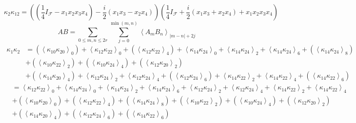 \documentclass[aps,preprint]{revtex4}%
\begin{document}
\begin{equation}
\kappa_{2}\kappa_{12}=\left(  \left(  \frac{1}{4}I_{\mathcal{F}}-x_{1}%
x_{2}x_{3}x_{4}\right)  -\frac{i}{2}\left(  x_{1}x_{3}-x_{2}x_{4}\right)
\right)  \left(  \frac{1}{4}I_{\mathcal{F}}+\frac{i}{2}\left(  x_{1}%
x_{3}+x_{2}x_{4}\right)  +x_{1}x_{2}x_{3}x_{4}\right)
\end{equation}%
\begin{equation}
AB=\sum_{0\leq m,n\leq2r}\sum_{j=0}^{\min\left(  m,n\right)  }\left\langle
A_{m}B_{n}\right\rangle _{\left\vert m-n\right\vert +2j}%
\end{equation}%
\begin{align}
\kappa_{1}\kappa_{2} &  =\left(  \left\langle \kappa_{10}\kappa_{20}%
\right\rangle _{0}\right)  +\left\langle \kappa_{12}\kappa_{22}\right\rangle
_{0}+\left(  \left\langle \kappa_{12}\kappa_{22}\right\rangle _{4}\right)
+\left\langle \kappa_{14}\kappa_{24}\right\rangle _{0}+\left\langle
\kappa_{14}\kappa_{24}\right\rangle _{2}+\left\langle \kappa_{14}\kappa
_{24}\right\rangle _{6}+\left(  \left\langle \kappa_{14}\kappa_{24}%
\right\rangle _{8}\right)  \\
&  +\left(  \left\langle \kappa_{10}\kappa_{22}\right\rangle _{2}\right)
+\left(  \left\langle \kappa_{10}\kappa_{24}\right\rangle _{4}\right)
+\left(  \left\langle \kappa_{12}\kappa_{20}\right\rangle _{2}\right)  \\
&  +\left(  \left\langle \kappa_{14}\kappa_{20}\right\rangle _{4}\right)
+\left\langle \kappa_{12}\kappa_{24}\right\rangle _{2}+\left\langle
\kappa_{12}\kappa_{24}\right\rangle _{4}+\left(  \left\langle \kappa
_{12}\kappa_{24}\right\rangle _{6}\right)  +\left\langle \kappa_{14}%
\kappa_{22}\right\rangle _{2}+\left\langle \kappa_{14}\kappa_{22}\right\rangle
_{4}+\left(  \left\langle \kappa_{14}\kappa_{22}\right\rangle _{6}\right)
\end{align}%
\begin{align}
&  =\left\langle \kappa_{12}\kappa_{22}\right\rangle _{0}+\left\langle
\kappa_{14}\kappa_{24}\right\rangle _{0}+\left\langle \kappa_{14}\kappa
_{24}\right\rangle _{2}+\left\langle \kappa_{14}\kappa_{24}\right\rangle
_{6}+\left\langle \kappa_{12}\kappa_{24}\right\rangle _{2}+\left\langle
\kappa_{12}\kappa_{24}\right\rangle _{4}+\left\langle \kappa_{14}\kappa
_{22}\right\rangle _{2}+\left\langle \kappa_{14}\kappa_{22}\right\rangle
_{4}\\
&  +\left(  \left\langle \kappa_{10}\kappa_{20}\right\rangle _{0}\right)
+\left(  \left\langle \kappa_{12}\kappa_{22}\right\rangle _{4}\right)
+\left(  \left\langle \kappa_{14}\kappa_{24}\right\rangle _{8}\right)
+\left(  \left\langle \kappa_{10}\kappa_{22}\right\rangle _{2}\right)
+\left(  \left\langle \kappa_{10}\kappa_{24}\right\rangle _{4}\right)
+\left(  \left\langle \kappa_{12}\kappa_{20}\right\rangle _{2}\right)  \\
&  +\left(  \left\langle \kappa_{14}\kappa_{20}\right\rangle _{4}\right)
+\left(  \left\langle \kappa_{12}\kappa_{24}\right\rangle _{6}\right)
+\left(  \left\langle \kappa_{14}\kappa_{22}\right\rangle _{6}\right)
\end{align}%
\end{document}
